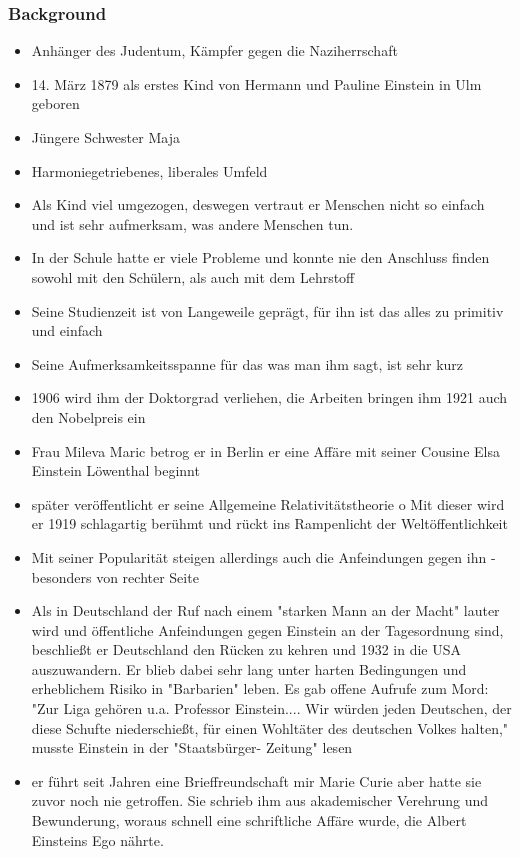 \documentclass[12pt, a4paper, openany]{report}
\begin{document}
\subsubsection{Background}
\begin{itemize}
\item Anhänger des Judentum, Kämpfer gegen die Naziherrschaft
\item 14. März 1879 als erstes Kind von Hermann und Pauline Einstein in Ulm geboren
\item Jüngere Schwester Maja
\item Harmoniegetriebenes, liberales Umfeld
\item Als Kind viel umgezogen, deswegen vertraut er Menschen nicht so einfach und ist sehr aufmerksam, was andere Menschen tun.
\item In der Schule hatte er viele Probleme und konnte nie den Anschluss finden sowohl mit den Schülern, als auch mit dem Lehrstoff
\item Seine Studienzeit ist von Langeweile geprägt, für ihn ist das alles zu primitiv und einfach
\item Seine Aufmerksamkeitsspanne für das was man ihm sagt, ist sehr kurz
\item 1906 wird ihm der Doktorgrad verliehen, die Arbeiten bringen ihm 1921 auch den Nobelpreis ein
\item Frau Mileva Maric betrog er in Berlin er eine Affäre mit seiner Cousine Elsa Einstein Löwenthal beginnt
\item später veröffentlicht er seine Allgemeine Relativitätstheorie 
o	Mit dieser wird er 1919 schlagartig berühmt und rückt ins Rampenlicht der Weltöffentlichkeit
\item Mit seiner Popularität steigen allerdings auch die Anfeindungen gegen ihn - besonders von rechter Seite
\item Als in Deutschland der Ruf nach einem "starken Mann an der Macht" lauter wird und öffentliche Anfeindungen gegen Einstein an der Tagesordnung sind, beschließt er Deutschland den Rücken zu kehren und 1932 in die USA auszuwandern. Er blieb dabei sehr lang unter harten Bedingungen und erheblichem Risiko in "Barbarien" leben. Es gab offene Aufrufe zum Mord: "Zur Liga gehören u.a. Professor Einstein.... Wir würden jeden Deutschen, der diese Schufte niederschießt, für einen Wohltäter des deutschen Volkes halten," musste Einstein in der "Staatsbürger- Zeitung" lesen
\item er führt seit Jahren eine Brieffreundschaft mir Marie Curie aber hatte sie zuvor noch nie getroffen. Sie schrieb ihm aus akademischer Verehrung und Bewunderung, woraus schnell eine schriftliche Affäre wurde, die Albert Einsteins Ego nährte.
\end{itemize}
\end{document}
